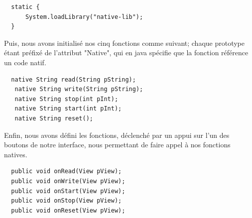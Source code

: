 \documentclass[french,a4paper,12pt]{report}
\begin{document}
\begin{lstlisting}
  static {
      System.loadLibrary("native-lib");
  }
\end{lstlisting}

Puis, nous avons initialisé nos cinq fonctions comme suivant; chaque prototype
étant préfixé de l'attribut "Native", qui en java spécifie que la fonction
référence un code natif.

\begin{lstlisting}
  native String read(String pString);
   native String write(String pString);
   native String stop(int pInt);
   native String start(int pInt);
   native String reset();
\end{lstlisting}

Enfin, nous avons défini les fonctions, déclenché par un appui sur l'un des
boutons de notre interface, nous permettant de faire appel à nos fonctions natives.

\begin{lstlisting}
  public void onRead(View pView);
  public void onWrite(View pView);
  public void onStart(View pView);
  public void onStop(View pView);
  public void onReset(View pView);
\end{lstlisting}
\end{document}
